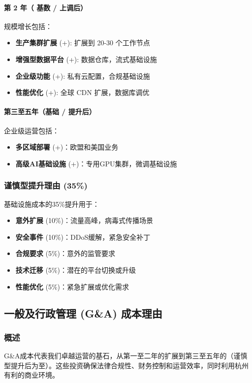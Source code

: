 \documentclass[11pt, a4paper, oneside]{article}
\begin{document}
\paragraph{第 2 年（ 基数 /  上调后）}
规模增长包括：
\begin{itemize}
    \item \textbf{生产集群扩展} (+): 扩展到 20-30 个工作节点
    \item \textbf{增强型数据平台} (+): 数据仓库，流式基础设施
    \item \textbf{企业级功能} (+): 私有云配置，合规基础设施
    \item \textbf{性能优化} (+): 全球 CDN 扩展，数据库调优
\end{itemize}

\paragraph{第三至五年（基础 / 提升后）}
企业级运营包括：
\begin{itemize}
    \item \textbf{多区域部署} (+)：欧盟和美国业务
    \item \textbf{高级AI基础设施} (+)：专用GPU集群，微调基础设施
\end{itemize}

\subsubsection{谨慎型提升理由 (35\%)}
基础设施成本的35\%提升用于：
\begin{itemize}
    \item \textbf{意外扩展} (10\%)：流量高峰，病毒式传播场景
    \item \textbf{安全事件} (10\%)：DDoS缓解，紧急安全补丁
    \item \textbf{合规要求} (5\%)：意外的监管要求
    \item \textbf{技术迁移} (5\%)：潜在的平台切换或升级
    \item \textbf{性能优化} (5\%)：紧急扩展或优化需求
\end{itemize}

\subsection{一般及行政管理 (G\&A) 成本理由}

\subsubsection{概述}
G\&A成本代表我们卓越运营的基石，从第一至二年的扩展到第三至五年的（谨慎型提升后为至）。这些投资确保法律合规性、财务控制和运营效率，同时利用杭州有利的商业环境。
\end{document}
